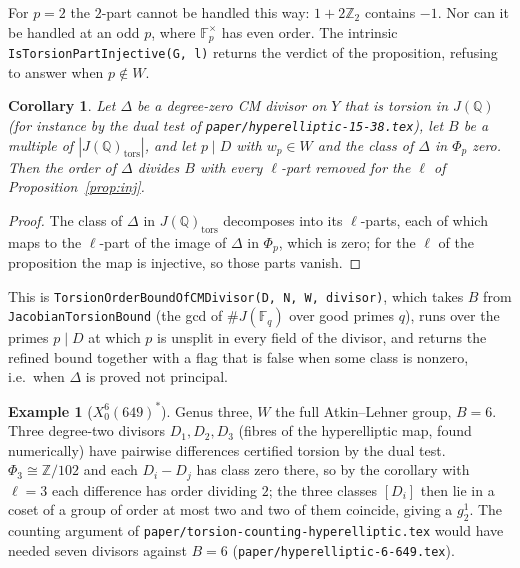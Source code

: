 \documentclass[11pt,reqno]{amsart}
\theoremstyle{plain}
\newtheorem{corollary}[theorem]{Corollary}
\theoremstyle{definition}
\newtheorem{example}[theorem]{Example}
\newcommand{\Q}{\mathbb{Q}}
\newcommand{\Z}{\mathbb{Z}}
\newcommand{\F}{\mathbb{F}}
\begin{document}
For $p=2$ the $2$-part cannot be handled this way: $1+2\Z_2$ contains $-1$. Nor can it be handled at an odd $p$,
where $\F_p^\times$ has even order. The intrinsic \texttt{IsTorsionPartInjective(G, l)} returns the verdict of
the proposition, refusing to answer when $p\notin W$.

\begin{corollary}\label{cor:bound}
Let $\Delta$ be a degree-zero CM divisor on $Y$ that is torsion in $J(\Q)$ (for instance by the dual test of
\texttt{paper/hyperelliptic-15-38.tex}), let $B$ be a multiple of $|J(\Q)_{\mathrm{tors}}|$, and let $p\mid D$ with
$w_p\in W$ and the class of $\Delta$ in $\Phi_p$ zero. Then the order of $\Delta$ divides $B$ with every
$\ell$-part removed for the $\ell$ of Proposition~\ref{prop:inj}.
\end{corollary}

\begin{proof}
The class of $\Delta$ in $J(\Q)_{\mathrm{tors}}$ decomposes into its $\ell$-parts, each of which maps to the
$\ell$-part of the image of $\Delta$ in $\Phi_p$, which is zero; for the $\ell$ of the proposition the map is
injective, so those parts vanish.
\end{proof}

This is \texttt{TorsionOrderBoundOfCMDivisor(D, N, W, divisor)}, which takes $B$ from
\texttt{JacobianTorsionBound} (the gcd of $\#J(\F_q)$ over good primes $q$), runs over the primes $p\mid D$ at
which $p$ is unsplit in every field of the divisor, and returns the refined bound together with a flag that is
false when some class is nonzero, i.e.\ when $\Delta$ is proved not principal.

\begin{example}[$X_0^6(649)^*$]
Genus three, $W$ the full Atkin--Lehner group, $B=6$. Three degree-two divisors $D_1,D_2,D_3$ (fibres of the
hyperelliptic map, found numerically) have pairwise differences certified torsion by the dual test. $\Phi_3\cong
\Z/102$ and each $D_i-D_j$ has class zero there, so by the corollary with $\ell=3$ each difference has order
dividing $2$; the three classes $[D_i]$ then lie in a coset of a group of order at most two and two of them
coincide, giving a $g^1_2$. The counting argument of \texttt{paper/torsion-counting-hyperelliptic.tex} would have
needed seven divisors against $B=6$ (\texttt{paper/hyperelliptic-6-649.tex}).
\end{example}
\end{document}
